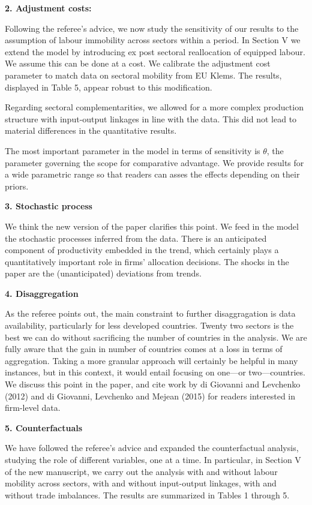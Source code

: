 \documentclass[12pt]{article}
\begin{document}
\textbf{2. Adjustment costs:}

Following the referee's advice, we now study the sensitivity of our results
to the assumption of labour immobility across sectors within a period. In
Section V we extend the model by introducing ex post sectoral reallocation
of equipped labour. We assume this can be done at a cost. We calibrate the
adjustment cost parameter to match data on sectoral mobility from EU Klems.
The results, displayed in Table 5, appear robust to this modification.

Regarding sectoral complementarities, we allowed for a more complex
production structure with input-output linkages in line with the data. This
did not lead to material differences in the quantitative results. 

The most important parameter in the model in terms of sensitivity is $\theta 
$, the parameter governing the scope for comparative advantage. We provide
results for a wide parametric range so that readers can asses the effects
depending on their priors.\bigskip 

\textbf{3. Stochastic process}

We think the new version of the paper clarifies this point. We feed in the
model the stochastic processes inferred from the data. There is an
anticipated component of productivity embedded in the trend, which certainly
plays a quantitatively important role in firms' allocation decisions. The
shocks in the paper are the (unanticipated) deviations from trends.\bigskip 

\textbf{4. Disaggregation}

As the referee points out, the main constraint to further disaggragation is
data availability, particularly for less developed countries. Twenty two
sectors is the best we can do without sacrificing the number of countries in
the analysis. We are fully aware that the gain in number of countries comes
at a loss in terms of aggregation. Taking a more granular approach will
certainly be helpful in many instances, but in this context, it would entail
focusing on one---or two---countries. We discuss this point in the paper,
and cite work by di Giovanni and Levchenko (2012) and di Giovanni, Levchenko
and Mejean (2015) for readers interested in firm-level data.\bigskip 

\textbf{5. Counterfactuals}

We have followed the referee's advice and expanded the counterfactual
analysis, studying the role of different variables, one at a time. In
particular, in Section V of the new manuscript, we carry out the analysis
with and without labour mobility across sectors, with and without
input-output linkages, with and without trade imbalances. The results are
summarized in Tables 1 through 5.
\end{document}
